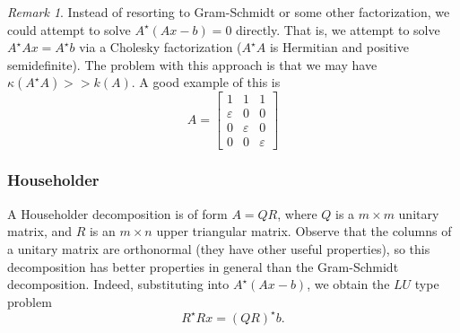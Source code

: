 \documentclass[12pt]{article}
\newcommand{\ee}{\varepsilon}
\theoremstyle{plain}
\theoremstyle{definition}
\theoremstyle{remark}
\newtheorem*{remark}{Remark}
\numberwithin{equation}{section}  %
\begin{document}
\begin{remark}
Instead of resorting to Gram-Schmidt or some other factorization, we could
attempt to solve $ A^{\star}(Ax - b) = 0 $ directly. That is, we attempt to
solve $ A^{\star}Ax = A^{\star}b $ via a Cholesky factorization ($ A^{\star}A$
is Hermitian and positive semidefinite). The problem with this approach is that
we may have $\kappa(A^{\star}A) >> k(A)$. A good example of this is 
\begin{equation*}
A = 
\begin{bmatrix}
 1 & 1 & 1 \\
 \ee & 0 & 0 \\
 0 & \ee & 0 \\
 0 & 0 & \ee 
\end{bmatrix}
\end{equation*}
\end{remark}
\subsubsection*{Householder}
A Householder decomposition is of form $A = QR$, where $Q$ is a $m \times m$ unitary matrix, and
$R$ is an $m \times n$ upper triangular matrix. Observe that the columns of a unitary matrix
are orthonormal (they have other useful properties), so this decomposition has better properties
in general than the Gram-Schmidt decomposition. Indeed, substituting into $A^{\star}(Ax-b)$, we 
obtain the $LU$ type problem
\begin{equation*}
R^{\star}R x = (QR)^{\star} b.
\end{equation*}
\end{document}

